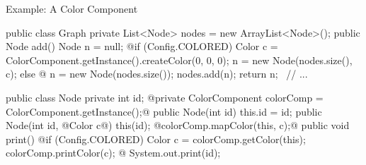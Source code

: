 \begin{frame}[fragile]{Example: A Color Component}
	\begin{mycolumns}[columns=2,widths={60,40},animation=none]
{\small
\begin{codetight}{}
public class Graph {
	private List<Node> nodes = new ArrayList<Node>();
	public Node add() {
		Node n = null;
		@if (Config.COLORED) {
			Color c = ColorComponent.getInstance().createColor(0, 0, 0);
			n = new Node(nodes.size(), c);
		} else @ {
			n = new Node(nodes.size());
		}
		nodes.add(n);
		return n;
	}
	~// ...~
}
\end{codetight}
}
		\mynextcolumn
\vspace{-0.5cm}
{\small
\begin{codetight}{}
public class Node {
	private int id;
	@private ColorComponent colorComp =
		ColorComponent.getInstance();@
	public Node(int id) { this.id = id; }
	public Node(int id, @Color c@) {
		this(id);
		@colorComp.mapColor(this, c);@
	}
	public void print() {
		@if (Config.COLORED) {
			Color c = colorComp.getColor(this);
			colorComp.printColor(c);
		}@
		System.out.print(id);
	}
}
\end{codetight}
}			
	\end{mycolumns}
\end{frame}

